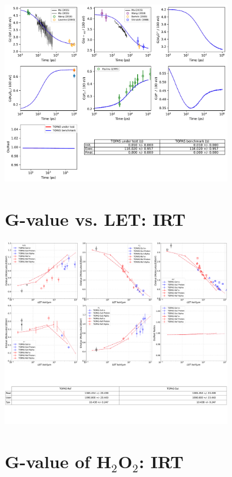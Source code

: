 \documentclass[aspectratio=1610]{beamer}
\begin{document}
\begin{frame}{\secname}
 \centering
  \includegraphics[width=0.75\textwidth]{./GvalueIRT/GvalueIRT}
\end{frame}

\section{G-value vs. LET: IRT}

\begin{frame}{\secname}
 \centering
  \includegraphics[width=0.75\textwidth]{./Gvalue_LET-IRT/Gvalue_LET-IRT}
\end{frame}

\section{G-value of H$_2$O$_2$: IRT}
\end{document}
